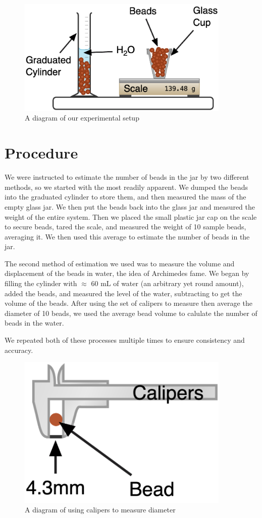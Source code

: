 \documentclass[12pt,letterpaper]{article}
\begin{document}
 \begin{figure}[h]
     \centering
     \includegraphics[width=4in]{images/setup.png}
     \caption{A diagram of our experimental setup}
     \label{fig:setup}
 \end{figure}


\section{Procedure}

We were instructed to estimate the number of beads in the jar by two different methods, so we started with the most readily apparent. We dumped the beads into the graduated cylinder to store them, and then measured the mass of the empty glass jar. We then put the beads back into the glass jar and measured the weight of the entire system. Then we placed the small plastic jar cap on the scale to secure beads, tared the scale, and measured the weight of 10 sample beads, averaging it. We then used this average to estimate the number of beads in the jar.

The second method of estimation we used was to measure the volume and displacement of the beads in water, the idea of Archimedes fame. We began by filling the cylinder with $\approx$ 60 mL of water (an arbitrary yet round amount), added the beads, and measured the level of the water, subtracting to get the volume of the beads. After using the set of calipers to measure then average the diameter of 10 beads, we used the average bead volume to calulate the number of beads in the water. 

We repeated both of these processes multiple times to ensure consistency and accuracy.

 \begin{figure}[h]
     \centering
     \includegraphics[width=4in]{images/measure.png}
     \caption{A diagram of using calipers to measure diameter}
     \label{fig:setup}
 \end{figure}
\end{document}
